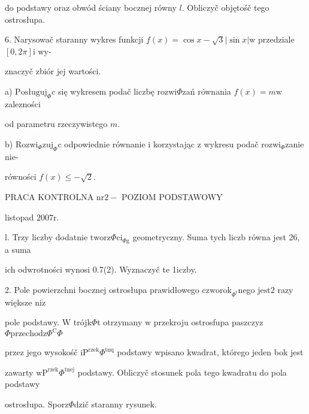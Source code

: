 \documentclass[a4paper,12pt]{article}
\begin{document}
do podstawy oraz obwód ściany bocznej równy $l$. Obliczyč objętośč tego ostrosłupa.

6. Narysowač staranny wykres funkcji $f(x)=\cos x-\sqrt{3}|\sin x| \mathrm{w}$ przedziale $[0,2\pi] \mathrm{i}$ wy-

znaczyč zbiór jej wartości.

a) $\mathrm{P}\mathrm{o}\mathrm{s}\text{ł} \mathrm{u}\mathrm{g}\mathrm{u}\mathrm{j}_{\Phi}\mathrm{c}$ się wykresem podač liczbę rozwi$\Phi$zań równania $f(x)=m\mathrm{w}$ zalezności

od parametru rzeczywistego $m.$

b) $\mathrm{R}\mathrm{o}\mathrm{z}\mathrm{w}\mathrm{i}_{\Phi}\mathrm{z}\mathrm{u}\mathrm{j}_{\Phi}\mathrm{c}$ odpowiednie równanie $\mathrm{i}$ korzystając $\mathrm{z}$ wykresu podač $\mathrm{r}\mathrm{o}\mathrm{z}\mathrm{w}\mathrm{i}_{\Phi}$zanie nie-

równości $f(x)\leq-\sqrt{2}.$





PRACA KONTROLNA $\mathrm{n}\mathrm{r}2-$ POZIOM PODSTAWOWY

listopad $2007\mathrm{r}.$

l. Trzy liczby dodatnie $\mathrm{t}\mathrm{w}\mathrm{o}\mathrm{r}\mathrm{z}\Phi \mathrm{c}\mathrm{i}_{\Phi \mathrm{g}}$ geometryczny. Suma tych liczb równa jest 26, a suma

ich odwrotności wynosi 0.7(2). Wyznaczyč te 1iczby.

2. Pole powierzchni bocznej ostrosłupa prawidłowego $\mathrm{c}\mathrm{z}\mathrm{w}\mathrm{o}\mathrm{r}\mathrm{o}\mathrm{k}_{\Phi^{\mathrm{t}}}$nego j$\mathrm{e}\mathrm{s}\mathrm{t}2$ razy większe $\mathrm{n}\mathrm{i}\dot{\mathrm{z}}$

pole podstawy. $\mathrm{W}$ trójk$\Phi$t otrzymany $\mathrm{w}$ przekroju ostrosfupa $\mathrm{p}\mathrm{a}$szczyz $\Phi \mathrm{p}\mathrm{r}\mathrm{z}\mathrm{e}\mathrm{c}\mathrm{h}\mathrm{o}\mathrm{d}\mathrm{z}\Phi^{\mathrm{C}}\Phi$

przez jego wysokośč $\mathrm{i} \mathrm{P}^{\mathrm{r}\mathrm{z}\mathrm{e}\mathrm{k}}\Phi^{\mathrm{t}\mathrm{n}\mathrm{q}}$ podstawy wpisano kwadrat, którego jeden bok jest

zawarty $\mathrm{w}\mathrm{P}^{\mathrm{r}\mathrm{z}\mathrm{e}\mathrm{k}}\Phi^{\mathrm{t}\mathrm{n}\mathrm{e}\mathrm{j}}$ podstawy. Obliczyč stosunek pola tego kwadratu do pola podstawy

ostrosłupa. Sporz$\Phi$dzič staranny rysunek.
\end{document}
